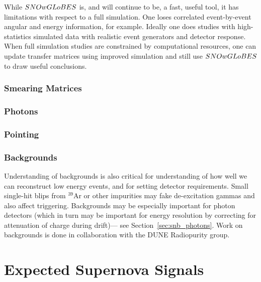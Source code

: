While $SNOwGLoBES$ is, and will continue to be, a fast, useful tool,
it has limitations with respect to a full simulation.  One loses correlated
event-by-event angular and energy information, for example.
Ideally one does studies with high-statistics simulated data with
realistic event generators and detector response.
When full simulation studies are constrained by computational resources,
one can update transfer matrices using improved simulation and still use
$SNOwGLoBES$ to draw useful conclusions.


\subsubsection{Smearing Matrices }

\subsubsection{Photons}

\subsubsection{Pointing}

\subsubsection{Backgrounds}

Understanding of backgrounds is also critical for understanding of how
well we can reconstruct low energy events, and for setting detector requirements.  Small single-hit blips
from $^{39}$Ar or other impurities may fake de-excitation gammas and also affect
triggering.  Backgrounds may be especially important for photon
detectors (which in turn may be important for energy resolution by
correcting for attenuation of charge during drift)--- see Section~\ref{sec:snb_photons}.  Work on
backgrounds is done in collaboration with the DUNE Radiopurity group.

\section{Expected Supernova Signals}


